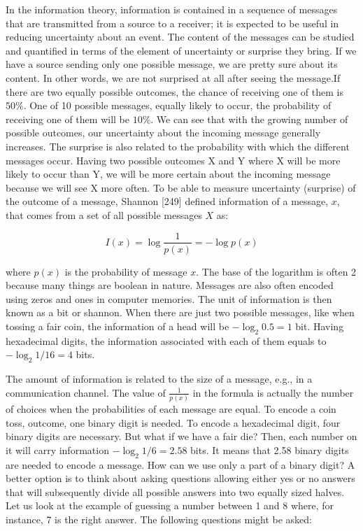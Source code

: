 \documentclass[11pt,openany,executivepaper]{book}
\begin{document}
In the information theory, information is contained in a sequence of messages that are transmitted from a source to a receiver; it is expected to be useful in reducing uncertainty about an event. The content of the messages can be studied and quantified in terms of the element of uncertainty or surprise they bring. If we have a source sending only one possible message, we are pretty sure about its content. In other words, we are not surprised at all after seeing the message.If there are two equally possible outcomes, the chance of receiving one of them is $50\%$. One of 10 possible messages, equally likely to occur, the probability of receiving one of them will be $10\%$. We can see that with the growing number of possible outcomes, our uncertainty about the incoming message generally increases. The surprise is also related to the probability with which the different messages occur. Having two possible outcomes X and Y where X will be more likely to occur than Y, we will be more certain about the incoming message because we will see X more often.
To be able to measure uncertainty (surprise) of the outcome of a message,
Shannon [249] defined information of a message, $x$, that comes from a set of all
possible messages $X$ as:

\begin{equation}
    I(x) = \log \frac{1}{p(x)} = -\log p(x)
\end{equation}

where $p(x)$ is the probability of message $x$. The base of the logarithm is often 2 because many things are boolean in nature. Messages are also often encoded using zeros and ones in computer memories. The unit of information is then known as a bit or shannon. When there are just two possible messages, like when tossing a fair coin, the information of a head will be $-\log_2 0.5 = 1$ bit. Having hexadecimal digits, the information associated with each of them equals to $-\log_2 1/16 = 4$ bits.

The amount of information is related to the size of a message, e.g., in a communication channel. The value of $\frac{1}{p(x)}$ in the formula is actually the number of choices when the probabilities of each message are equal. To encode a coin toss, outcome, one binary digit is needed. To encode a hexadecimal digit, four binary digits are necessary. But what if we have a fair die? Then, each number on it will carry information $-\log_2 1/6 = 2.58$ bits. It means that 2.58 binary digits are
needed to encode a message. How can we use only a part of a binary digit? A better option is to think about asking questions allowing either yes or no answers that will subsequently divide all possible answers into two equally sized halves. Let us look at the example of guessing a number between 1 and 8 where, for
instance, 7 is the right answer. The following questions might be asked:
\end{document}
